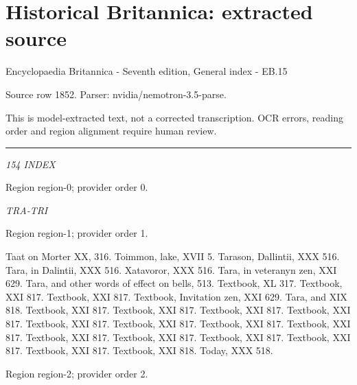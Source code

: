 \documentclass[11pt]{article}
\begin{document}
\section*{Historical Britannica: extracted source}
Encyclopaedia Britannica - Seventh edition, General index - EB.15\par
{\small Source row 1852. Parser: nvidia/nemotron-3.5-parse.\par}
{\small This is model-extracted text, not a corrected transcription. OCR errors, reading order and region alignment require human review.\par}
\hrule\medskip
{\small\itshape 154 INDEX\par}

{\scriptsize\color{gray} Region region-0; provider order 0.\par}
\medskip

{\small\itshape TRA-TRI\par}

{\scriptsize\color{gray} Region region-1; provider order 1.\par}
\medskip

Taat on Morter XX, 316. Toimmon, lake, XVII 5.
Tarason, Dallintii, XXX 516.
Tara, in Dalintii, XXX 516.
Xatavoror, XXX 516.
Tara, in veteranyn zen, XXI 629.
Tara, and other words of effect on
bells, 513. Textbook, XL 317.
Textbook, XXI 817.
Textbook, XXI 817.
Textbook, Invitation zen, XXI 629.
Tara, and XIX 818.
Textbook, XXI 817.
Textbook, XXI 817.
Textbook, XXI 817.
Textbook, XXI 817.
Textbook, XXI 817.
Textbook, XXI 817.
Textbook, XXI 817.
Textbook, XXI 817.
Textbook, XXI 817.
Textbook, XXI 817.
Textbook, XXI 817.
Textbook, XXI 817.
Textbook, XXI 817.
Textbook, XXI 818.
Today, XXX 518.
\par

{\scriptsize\color{gray} Region region-2; provider order 2.\par}
\medskip
\end{document}

